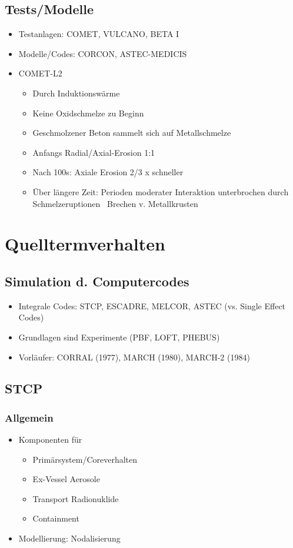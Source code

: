 \documentclass[12pt]{article}
\begin{document}
\subsection{Tests/Modelle}
\begin{itemize}
	\item Testanlagen: COMET, VULCANO, BETA I
	\item Modelle/Codes: CORCON, ASTEC-MEDICIS
	\item COMET-L2
		\begin{itemize}
			\item Durch Induktionswärme
			\item Keine Oxidschmelze zu Beginn
			\item Geschmolzener Beton sammelt sich auf Metallschmelze
			\item Anfangs Radial/Axial-Erosion 1:1
			\item Nach 100s: Axiale Erosion 2/3 x schneller
			\item Über längere Zeit: Perioden moderater Interaktion unterbrochen durch Schmelzeruptionen
				\textrightarrow\ Brechen v. Metallkrusten
		\end{itemize}
\end{itemize}

\section{Quelltermverhalten}

\subsection{Simulation d. Computercodes}
\begin{itemize}
	\item Integrale Codes: STCP, ESCADRE, MELCOR, ASTEC (vs. Single Effect Codes)
	\item Grundlagen sind Experimente (PBF, LOFT, PHEBUS)
	\item Vorläufer: CORRAL (1977), MARCH (1980), MARCH-2 (1984)
\end{itemize}

\subsection{STCP}

\subsubsection{Allgemein}
\begin{itemize}
	\item Komponenten für
		\begin{itemize}
			\item Primärsystem/Coreverhalten
			\item Ex-Vessel Aerosole
			\item Transport Radionuklide
			\item Containment
		\end{itemize}
	\item Modellierung: Nodalisierung
\end{itemize}
\end{document}
